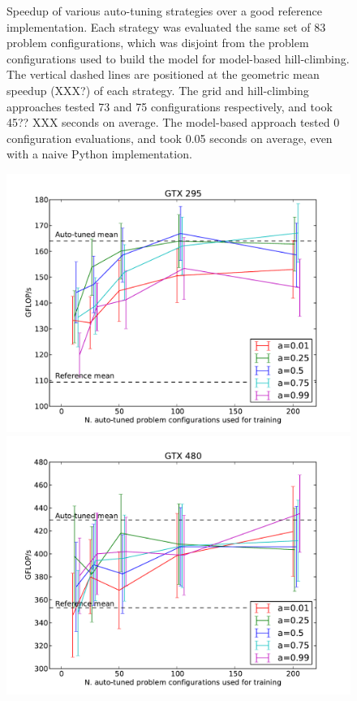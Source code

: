 \documentclass{sig-alternate}
\begin{document}
\begin{figure}
\caption{Speedup of various auto-tuning strategies over a good reference
implementation.
Each strategy was evaluated the same set of 83 problem configurations, which
was disjoint from the problem configurations used to build the model for
model-based hill-climbing.
The vertical dashed lines are positioned at the geometric mean speedup (XXX?)
of each strategy. The grid and hill-climbing approaches
tested 73 and 75 configurations respectively, and took 45?? XXX
seconds on average.
The model-based approach tested 0 configuration evaluations, and took 0.05
seconds on average, even with a naive Python implementation.
}
\label{fig:speedup}
\end{figure}


\begin{figure}
\centering
\includegraphics[scale=.42]{fig_ntrain_295.pdf}
\includegraphics[scale=.42]{fig_ntrain_480.pdf}

\end{figure}
\end{document}
